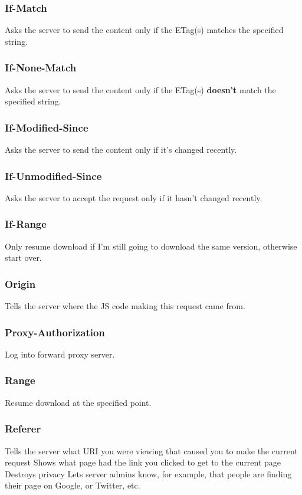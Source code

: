 \documentclass[../CMPUT-404-Notes.tex]{subfiles}
\begin{document}
\subsubsection{If-Match}
Asks the server to send the content only if the ETag(s) matches the specified string.

\subsubsection{If-None-Match}
Asks the server to send the content only if the ETag(s) \textbf{doesn't} match the specified string.

\subsubsection{If-Modified-Since} 
Asks the server to send the content only if it's changed recently.

\subsubsection{If-Unmodified-Since}
Asks the server to accept the request only if it hasn't changed recently.

\subsubsection{If-Range}
Only resume download if I'm still going to download the same version, otherwise start over.

\subsubsection{Origin}
Tells the server where the JS code making this request came from.

\subsubsection{Proxy-Authorization}
Log into forward proxy server.

\subsubsection{Range}
Resume download at the specified point.

\subsubsection{Referer}
Tells the server what URI you were viewing that caused you to make the current request
Shows what page had the link you clicked to get to the current page
Destroys privacy
Lets server admins know, for example, that people are finding their page on Google, or Twitter, etc.
\end{document}

